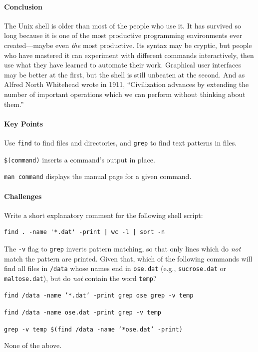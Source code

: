 \documentclass{book}
\begin{document}
\mbox{}\paragraph{Conclusion}

The Unix shell is older than most of the people who use it. It has
survived so long because it is one of the most productive programming
environments ever created---maybe even \emph{the} most productive. Its
syntax may be cryptic, but people who have mastered it can experiment
with different commands interactively, then use what they have learned
to automate their work. Graphical user interfaces may be better at the
first, but the shell is still unbeaten at the second. And as Alfred
North Whitehead wrote in 1911, ``Civilization advances by extending the
number of important operations which we can perform without thinking
about them.''

\mbox{}\paragraph{Key Points}

\begin{swcitemize}
\item
  Use \texttt{find} to find files and directories, and \texttt{grep} to
  find text patterns in files.
\item
  \texttt{\$(command)} inserts a command's output in place.
\item
  \texttt{man command} displays the manual page for a given command.
\end{swcitemize}

\mbox{}\paragraph{Challenges}

\begin{swcenumerate}
\item
  Write a short explanatory comment for the following shell script:

\begin{verbatim}
find . -name '*.dat' -print | wc -l | sort -n
\end{verbatim}
\item
  The \texttt{-v} flag to \texttt{grep} inverts pattern matching, so
  that only lines which do \emph{not} match the pattern are printed.
  Given that, which of the following commands will find all files in
  \texttt{/data} whose names end in \texttt{ose.dat} (e.g.,
  \texttt{sucrose.dat} or \texttt{maltose.dat}), but do \emph{not}
  contain the word \texttt{temp}?

  \begin{swcenumerate2}
  \item
    \texttt{find /data -name '*.dat' -print \textbar{} grep ose \textbar{} grep -v temp}
  \item
    \texttt{find /data -name ose.dat -print \textbar{} grep -v temp}
  \item
    \texttt{grep -v temp \$(find /data -name '*ose.dat' -print)}
  \item
    None of the above.
  \end{swcenumerate2}
\end{swcenumerate}
\end{document}

